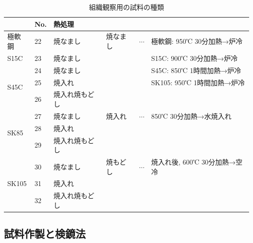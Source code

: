 \documentclass[a4paper,11pt,uplatex]{jsarticle}
\begin{document}
\begin{table}[H]
  \begin{center}
  \caption{組織観察用の試料の種類}
  \label{試料の種類}

  \begin{tabular}{|l|l|l|lll|}
  \hline
                         & No. & 熱処理     &      &                       &                      \\ \hline
  極軟鋼                  & 22  & 焼なまし    & 焼なまし & $\cdots$ & 極軟鋼: 950℃ 30分加熱→炉冷   \\ \cline{1-3}
  S15C                   & 23  & 焼なまし    &      &                       & S15C: 900℃ 30分加熱→炉冷  \\ \cline{1-3}
  \multirow{3}{*}{S45C}  & 24  & 焼なまし    &      &                       & S45C: 850℃ 1時間加熱→炉冷  \\ \cline{2-3}
                         & 25  & 焼入れ     &      &                       & SK105: 950℃ 1時間加熱→炉冷 \\ \cline{2-3}
                         & 26  & 焼入れ焼もどし &      &                       &                      \\ \cline{1-3}
  \multirow{3}{*}{SK85}  & 27  & 焼なまし    & 焼入れ  & $\cdots$ & 850℃ 30分加熱→水焼入れ      \\ \cline{2-3}
                         & 28  & 焼入れ     &      &                       &                      \\ \cline{2-3}
                         & 29  & 焼入れ焼もどし &      &                       &                      \\ \cline{1-3}
  \multirow{3}{*}{SK105} & 30  & 焼なまし    & 焼もどし & $\cdots$ & 焼入れ後, 600℃ 30分加熱→空冷  \\ \cline{2-3}
                         & 31  & 焼入れ     &      &                       &                      \\ \cline{2-3}
                         & 32  & 焼入れ焼もどし &      &                       &                      \\ \hline
  \end{tabular}
\end{center}
\end{table}

\subsection{試料作製と検鏡法}
\end{document}
